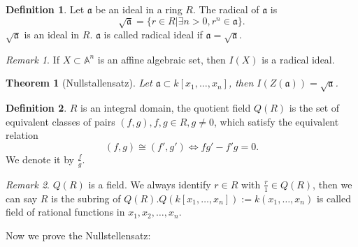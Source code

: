 \documentclass{amsart}
\theoremstyle{plain}
\newtheorem{theorem}{Theorem}
\theoremstyle{definition}
\newtheorem{definition}{Definition}
\theoremstyle{remark}
\newtheorem*{remark}{Remark}
\numberwithin{equation}{section}
\begin{document}
  \begin{definition}
  	Let $ \mathfrak{a} $ be an ideal in a ring $ R $. The radical of $ \mathfrak{a} $ is
  	$$
  	\sqrt{\mathfrak{a}}=\{ r\in R|\exists n>0, r^n\in \mathfrak{a} \}.
  	$$
  	$ \sqrt{\mathfrak{a}} $ is an ideal in $ R $.
  	$ \mathfrak{a} $ is called radical ideal if $ \mathfrak{a}=\sqrt{\mathfrak{a}} $.
  \end{definition}
  \begin{remark}
  	If $ X\subset \mathbb{A}^n $ is an affine algebraic set, then $ I(X) $ is a radical ideal.
  \end{remark}
  \begin{theorem}[Nullstallensatz]
  	Let $ \mathfrak{a}\subset k[x_1,\dots,x_n] $, then $ I(Z(\mathfrak{a}))=\sqrt{\mathfrak{a}} $.
  \end{theorem}
  \begin{definition}
  	$ R $ is an integral domain, the quotient field $ Q(R) $ is the set of equivalent classes of pairs $ (f,g), f,g\in R, g\neq 0 $, which satisfy the equivalent relation
  	$$
  	(f,g)\cong (f',g') \Leftrightarrow fg'-f'g=0.
  	$$
  	We denote it by $ \frac{f}{g} $.
  \end{definition}
  \begin{remark}
  	$ Q(R) $ is a field. We always identify $ r\in R $ with $ \frac{r}{1}\in Q(R) $, then we can say $ R $ is the subring of $ Q(R) $.$ Q(k[x_1,\dots,x_n]):=k(x_1,\dots,x_n) $ is called field of rational functions in $ x_1,x_2,\dots,x_n $.
  \end{remark}
  Now we prove the Nullstellensatz:
\end{document}
